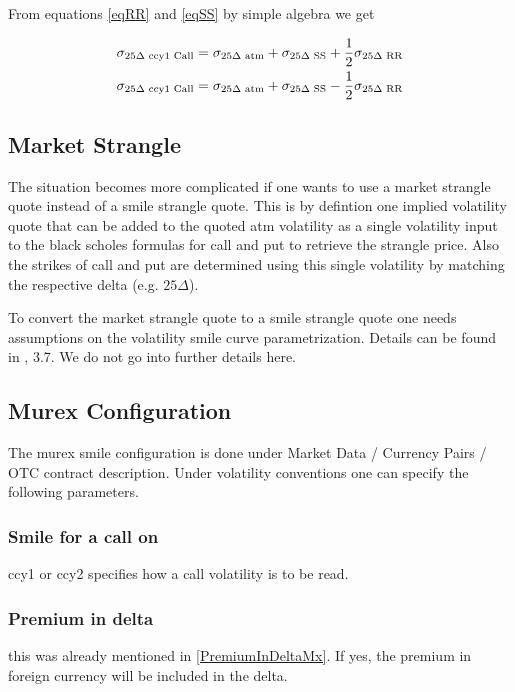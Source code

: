 \documentclass{amsart}
\theoremstyle{plain}
\numberwithin{equation}{section}
\begin{document}
From equations \ref{eqRR} and \ref{eqSS} by simple algebra we get

\begin{eqnarray}
\sigma_{25\Delta\textnormal{ ccy1 Call}} = \sigma_{25\Delta\textnormal{ atm}} + \sigma_{25\Delta\textnormal{ SS}} + \frac{1}{2} \sigma_{25\Delta\textnormal{ RR}} \\
\sigma_{25\Delta\textnormal{ ccy1 Call}} = \sigma_{25\Delta\textnormal{ atm}} + \sigma_{25\Delta\textnormal{ SS}} - \frac{1}{2} \sigma_{25\Delta\textnormal{ RR}}
\end{eqnarray}

\subsection{Market Strangle}

The situation becomes more complicated if one wants to use a market strangle quote instead of a 
smile strangle quote. This is by defintion one implied volatility quote that can be added to the 
quoted atm volatility as a single volatility input to the black scholes formulas for call and put
to retrieve the strangle price. Also the strikes of call and put are determined using this single
volatility by matching the respective delta (e.g. $25\Delta$).

To convert the market strangle quote to a smile strangle quote one needs assumptions on the 
volatility smile curve parametrization. Details can be found in \cite{Clark}, 3.7. We do not
go into further details here.

\subsection{Murex Configuration}

The murex smile configuration is done under Market Data / Currency Pairs / OTC contract description.
Under volatility conventions one can specify the following parameters.

\subsubsection{Smile for a call on}
ccy1 or ccy2 specifies how a call volatility is to be read.

\subsubsection{Premium in delta}
this was already mentioned in \ref{PremiumInDeltaMx}. If yes, the premium in foreign currency will
be included in the delta.
\end{document}
